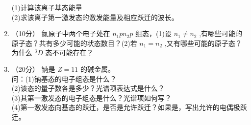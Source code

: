 \begin{enumerate}
(1)计算该离子基态能量\\
(2)求该离子第一激发态的激发能量及相应跃迁的波长。
\item （10分）
氮原子中两个电子处在 $n_{1}pn_{2}p$ 组态，(1)设 $n_1\neq n_2$ ,有哪些可能的原子态？共有多少可能的状态数目？(2)若 $n_1=n_2$ ,又有哪些可能的原子态？为什么 $^{3}D$ 态不可能存在？
\item （20分） 
钠是 $Z=11$ 的碱金属。\\问：(1)钠基态的电子组态是什么？\\(2)该态的量子数各是多少？光谱项表达式是什么？\\(3)其第一激发态的电子组态是什么？光谱项如何写？\\(4)第一激发态向基态的跃迁，是否是允许跃迁？如果是，写出允许的电偶极跃迁。
\end{enumerate}
